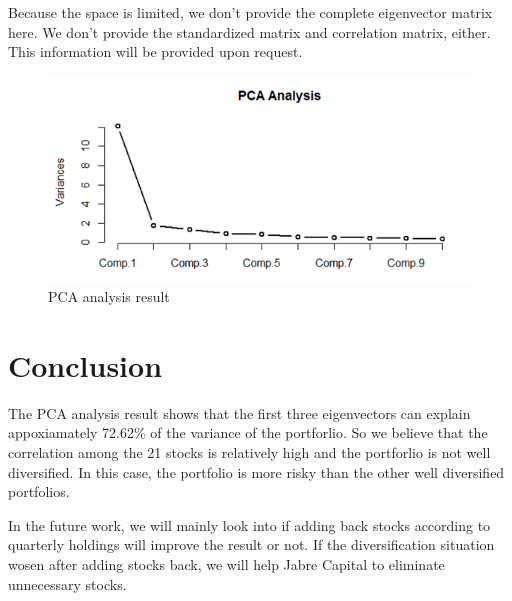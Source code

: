 \documentclass[oneside,12pt]{report}
\begin{document}
Because the space is limited, we don't provide the complete eigenvector matrix here. We don't provide the standardized matrix and correlation matrix, either. This information will be provided upon request.
\begin{figure}[ht]
    \begin{center}
        \includegraphics[width=\textwidth]{5.png}
    \end{center}
    \caption{PCA analysis result}
    \label{fig:eigenvector}
\end{figure}


\chapter{Conclusion}\label{Conclusion}
The PCA analysis result shows that the first three eigenvectors can explain appoxiamately 72.62\% of the variance of the portforlio. So we believe that the correlation among the 21 stocks is relatively high and the portforlio is not well diversified. In this case, the portfolio is more risky than the other well diversified portfolios. 

In the future work, we will mainly look into if adding back stocks according to quarterly holdings will improve the result or not. If the diversification situation wosen after adding stocks back, we will help Jabre Capital to eliminate unnecessary stocks. 

%
%
%
%
%
%


\appendix
{}

\end{document}
